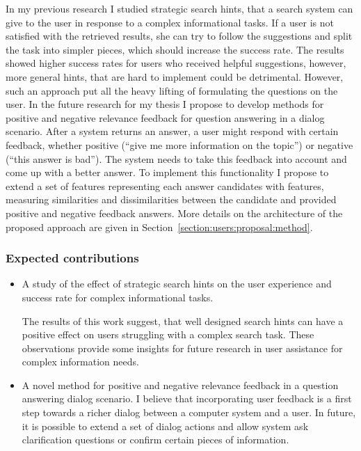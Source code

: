 In my previous research I studied strategic search hints, that a search system can give to the user in response to a complex informational tasks.
If a user is not satisfied with the retrieved results, she can try to follow the suggestions and split the task into simpler pieces, which should increase the success rate.
The results showed higher success rates for users who received helpful suggestions, however, more general hints, that are hard to implement could be detrimental.
However, such an approach put all the heavy lifting of formulating the questions on the user.
In the future research for my thesis I propose to develop methods for positive and negative relevance feedback for question answering in a dialog scenario.
After a system returns an answer, a user might respond with certain feedback, whether positive (\eg ``give me more information on the topic'') or negative (\eg ``this answer is bad'').
The system needs to take this feedback into account and come up with a better answer.
To implement this functionality I propose to extend a set of features representing each answer candidates with features, measuring similarities and dissimilarities between the candidate and provided positive and negative feedback answers.
More details on the architecture of the proposed approach are given in Section~\ref{section:users:proposal:method}.

\subsubsection{Expected contributions}
\label{section:proposal:plan:users:contributions}

\begin{itemize}
\item A study of the effect of strategic search hints on the user experience and success rate for complex informational tasks.

The results of this work suggest, that well designed search hints can have a positive effect on users struggling with a complex search task.
These observations provide some insights for future research in user assistance for complex information needs.

\item A novel method for positive and negative relevance feedback in a question answering dialog scenario. 
I believe that incorporating user feedback is a first step towards a richer dialog between a computer system and a user.
In future, it is possible to extend a set of dialog actions and allow system ask clarification questions or confirm certain pieces of information.
\end{itemize}


